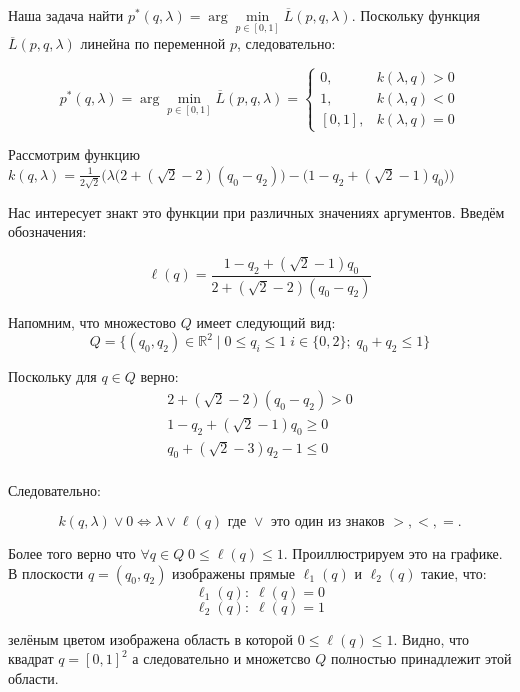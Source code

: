 \begin{flushleft}
	Наша задача найти 
	$p^*(q, \lambda)=\arg \min \limits_{p \in [0, 1]} \overline{L}(p,q,\lambda)$.
	Поскольку функция $\overline{L}(p,q,\lambda)$ линейна по переменной 
	$p$, следовательно:
	
	$$
		p^*(q, \lambda)=
		\arg \min \limits_{p \in [0, 1]} \overline{L}(p,q,\lambda)=
		\begin{cases}
			0, & k(\lambda,q)>0 \\
			1, & k(\lambda,q)<0 \\
			[0,1], & k(\lambda,q)=0
		\end{cases}	
	$$
	
	Рассмотрим функцию $k(q, \lambda)=\frac{1}{2\sqrt{2}}
	\Big(
		\lambda \big (2+(\sqrt{2}-2)(q_0-q_2) \big) -
		\big (1 - q_2 + (\sqrt{2} - 1)q_0 \big)
	\Big)
	$

	Нас интересует знакт это функции при различных значениях аргументов.
	Введём обозначения:
	
	$$\ell(q) = \frac{1 - q_2 + (\sqrt{2} - 1)q_0}{2+(\sqrt{2}-2)(q_0-q_2)}$$	
	
	Напомним, что множестово $Q$ имеет следующий вид:
	$$
		Q=\{(q_0,q_2) \in \mathbb{R}^2 \; | \;
		0 \leqslant q_i \leqslant 1 \; i\in\{0,2\}; \; 
		q_0 + q_2 \leqslant 1\}	
	$$	
	
	Поскольку для $q \in Q$ верно: 
	\begin{gather*}
	2+(\sqrt{2}-2)(q_0-q_2) > 0 \\
	1 - q_2 + (\sqrt{2} - 1)q_0 \geqslant 0 \\
	q_0 + (\sqrt{2} - 3) q_2 - 1 \leqslant 0 \\
	\end{gather*}
	
	Следовательно:
	
	$$
	k(q, \lambda) \vee 0 \Leftrightarrow 
	\lambda \vee \ell(q) \textrm{ где } \vee \textrm{ это один из знаков } >,<,=.
	$$
	
	Более того верно что 
	$\forall q \in Q \; 0 \leqslant \ell(q) \leqslant 1$. 
	Проиллюстрируем это на графике. В плоскости $q=(q_0,q_2)$ изображены 
	прямые $\ell_1(q)$ и $\ell_2(q)$ такие, что:
	$$\ell_1(q): \; \ell(q)=0 $$
	$$\ell_2(q): \; \ell(q)=1 $$
		
	зелёным цветом изображена область в которой
	$0 \leqslant \ell(q) \leqslant 1$.
	Видно, что квадрат $q = [0,1]^2$ а следовательно и
	множетсво $Q$ полностью принадлежит этой области.


\end{flushleft}
